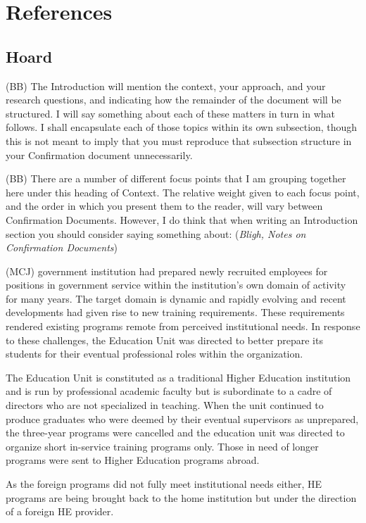 \documentclass[a4paper,man,natbib]{apa6}
\begin{document}
\section{References}


\subsection{Hoard}
(BB)
The Introduction will mention the context, your approach, and your research questions, and indicating how the remainder of the document will be structured. I will say something about each of these matters in turn in what follows. I shall encapsulate each of those topics within its own subsection, though this is not meant to imply that you must reproduce that subsection structure in your Confirmation document unnecessarily.

(BB)
There are a number of different focus points that I am grouping together here under this heading of Context. The relative weight given to each focus point, and the order in which you present them to the reader, will vary between Confirmation Documents. However, I do think that when writing an Introduction section you should consider saying something about: (\textit{Bligh, Notes on Confirmation Documents})

(MCJ)
government institution had prepared newly recruited employees for positions in government service within the institution's own domain of activity for many years. The target domain is dynamic and rapidly evolving and recent developments had given rise to new training requirements. These requirements rendered existing programs remote from perceived institutional needs. In response to these challenges, the Education Unit was directed to better prepare its students for their eventual professional roles within the organization. 



The Education Unit is constituted as a traditional Higher Education institution and is run by professional academic faculty but is subordinate to a cadre of directors who are not specialized in teaching. When the unit continued to produce graduates who were deemed by their eventual supervisors as unprepared, the three-year programs were cancelled and the education unit was directed to organize short in-service training programs only. Those in need of longer programs were sent to Higher Education programs abroad.

As the foreign programs did not fully meet institutional needs either, HE programs are being brought back to the home institution but under the direction of a foreign HE provider. 
\end{document}
